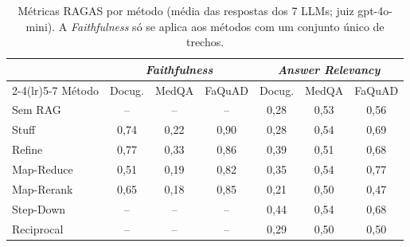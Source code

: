 \begin{table}[!t]
\centering
\footnotesize
\setlength{\tabcolsep}{2.4pt}
\caption{Métricas RAGAS por método (média das respostas dos 7 LLMs; juiz gpt-4o-mini). A \emph{Faithfulness} só se aplica aos métodos com um conjunto único de trechos.}
\label{tab:ragas}
\begin{tabular}{lcccccc}
\toprule
 & \multicolumn{3}{c}{\emph{Faithfulness}} & \multicolumn{3}{c}{\emph{Answer Relevancy}} \\
\cmidrule(lr){2-4}\cmidrule(lr){5-7}
Método & Docug. & MedQA & FaQuAD & Docug. & MedQA & FaQuAD \\
\midrule
Sem RAG & -- & -- & -- & 0,28 & 0,53 & 0,56 \\
Stuff & 0,74 & 0,22 & 0,90 & 0,28 & 0,54 & 0,69 \\
Refine & 0,77 & 0,33 & 0,86 & 0,39 & 0,51 & 0,68 \\
Map-Reduce & 0,51 & 0,19 & 0,82 & 0,35 & 0,54 & 0,77 \\
Map-Rerank & 0,65 & 0,18 & 0,85 & 0,21 & 0,50 & 0,47 \\
Step-Down & -- & -- & -- & 0,44 & 0,54 & 0,68 \\
Reciprocal & -- & -- & -- & 0,29 & 0,50 & 0,50 \\
\bottomrule
\end{tabular}
\end{table}
